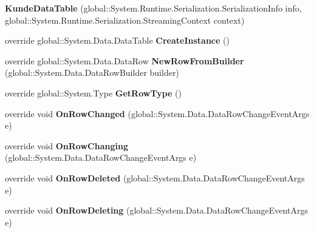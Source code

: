 \begin{DoxyCompactItemize}
\item 
{\bfseries Kunde\+Data\+Table} (global\+::\+System.\+Runtime.\+Serialization.\+Serialization\+Info info, global\+::\+System.\+Runtime.\+Serialization.\+Streaming\+Context context)\hypertarget{class_products_1_1_data_1_1ds_sage_1_1_kunde_data_table_a078afa3fbf843af22515d7bfc5a1b431}{}\label{class_products_1_1_data_1_1ds_sage_1_1_kunde_data_table_a078afa3fbf843af22515d7bfc5a1b431}

\item 
override global\+::\+System.\+Data.\+Data\+Table {\bfseries Create\+Instance} ()\hypertarget{class_products_1_1_data_1_1ds_sage_1_1_kunde_data_table_a323cd3864402b90b9bdb98f36434155c}{}\label{class_products_1_1_data_1_1ds_sage_1_1_kunde_data_table_a323cd3864402b90b9bdb98f36434155c}

\item 
override global\+::\+System.\+Data.\+Data\+Row {\bfseries New\+Row\+From\+Builder} (global\+::\+System.\+Data.\+Data\+Row\+Builder builder)\hypertarget{class_products_1_1_data_1_1ds_sage_1_1_kunde_data_table_a03e0b3849943d6142774c8662f35a5e1}{}\label{class_products_1_1_data_1_1ds_sage_1_1_kunde_data_table_a03e0b3849943d6142774c8662f35a5e1}

\item 
override global\+::\+System.\+Type {\bfseries Get\+Row\+Type} ()\hypertarget{class_products_1_1_data_1_1ds_sage_1_1_kunde_data_table_a308e290682b5a264c17a621948db8814}{}\label{class_products_1_1_data_1_1ds_sage_1_1_kunde_data_table_a308e290682b5a264c17a621948db8814}

\item 
override void {\bfseries On\+Row\+Changed} (global\+::\+System.\+Data.\+Data\+Row\+Change\+Event\+Args e)\hypertarget{class_products_1_1_data_1_1ds_sage_1_1_kunde_data_table_a5f48752ffcbfe69852e3289b7423693a}{}\label{class_products_1_1_data_1_1ds_sage_1_1_kunde_data_table_a5f48752ffcbfe69852e3289b7423693a}

\item 
override void {\bfseries On\+Row\+Changing} (global\+::\+System.\+Data.\+Data\+Row\+Change\+Event\+Args e)\hypertarget{class_products_1_1_data_1_1ds_sage_1_1_kunde_data_table_adc7ec5337c613e18120788339c6d3768}{}\label{class_products_1_1_data_1_1ds_sage_1_1_kunde_data_table_adc7ec5337c613e18120788339c6d3768}

\item 
override void {\bfseries On\+Row\+Deleted} (global\+::\+System.\+Data.\+Data\+Row\+Change\+Event\+Args e)\hypertarget{class_products_1_1_data_1_1ds_sage_1_1_kunde_data_table_af0504f313f6f5b82c5eabc08be40580b}{}\label{class_products_1_1_data_1_1ds_sage_1_1_kunde_data_table_af0504f313f6f5b82c5eabc08be40580b}

\item 
override void {\bfseries On\+Row\+Deleting} (global\+::\+System.\+Data.\+Data\+Row\+Change\+Event\+Args e)\hypertarget{class_products_1_1_data_1_1ds_sage_1_1_kunde_data_table_a1cee6542d18514fab0a04bfd256a1cf5}{}\label{class_products_1_1_data_1_1ds_sage_1_1_kunde_data_table_a1cee6542d18514fab0a04bfd256a1cf5}

\end{DoxyCompactItemize}

